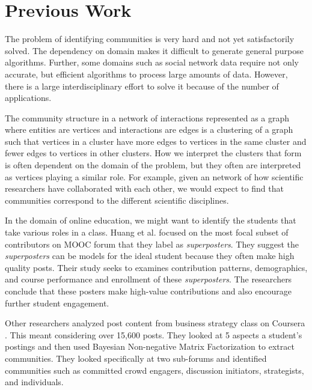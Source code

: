 \section{Previous Work}
The problem of identifying communities is very hard and not yet satisfactorily solved. The dependency on domain makes it difficult to generate general purpose algorithms. Further, some domains such as social network data require not only accurate, but efficient algorithms to process large amounts of data. However, there is a large interdisciplinary effort to solve it because of the number of applications.

The community structure in a network of interactions represented as a graph where entities are vertices and interactions are edges is a clustering of a graph such that vertices in a cluster have more edges to vertices in the same cluster and fewer edges to vertices in other clusters\cite{2010PhR...486...75F}. How we interpret the clusters that form is often dependent on the domain of the problem, but they often are interpreted as vertices playing a similar role. For example, given an network of how scientific researchers have collaborated with each other, we would expect to find that communities correspond to the different scientific disciplines. 

In the domain of online education, we might want to identify the students that take various roles in a class. Huang et al. \cite{Huang:2014:SBM:2556325.2566249} focused on the most focal subset of contributors on MOOC forum that they label as \emph{superposters}. They suggest the \emph{superposters} can be models for the ideal student because they often make high quality posts. Their study seeks to examines contribution patterns, demographics, and course performance and enrollment of these \emph{superposters}. The researchers conclude that these posters make high-value contributions and also encourage further student engagement. 

Other researchers analyzed post content from business strategy class on Coursera \cite{DBLP:journals/corr/GillaniEOHR14}. This meant considering over 15,600 posts. They looked at 5 aspects a student's postings and then used Bayesian Non-negative Matrix Factorization to extract communities. They looked specifically at two sub-forums and identified communities such as committed crowd engagers, discussion initiators, strategists, and individuals.
